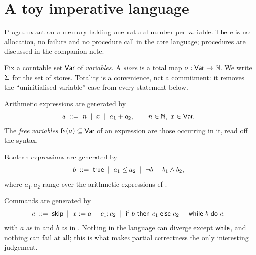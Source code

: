 \section{A toy imperative language}
\label{sec:syntax}

Programs act on a memory holding one natural number per variable. There is no
allocation, no failure and no procedure call in the core language; procedures
are discussed in the companion note.

\begin{definition}[stores]
\label{def:state}
Fix a countable set $\mathsf{Var}$ of \emph{variables}. A \emph{store} is a total map
$\sigma : \mathsf{Var} \to \mathbb{N}$. We write $\Sigma$ for the set of stores. Totality is
a convenience, not a commitment: it removes the ``uninitialised variable'' case
from every statement below.
\end{definition}

\begin{definition}
\label{def:aexp}
Arithmetic expressions are generated by
\[
  a \;::=\; n \;\mid\; x \;\mid\; a_1 + a_2,
  \qquad n \in \mathbb{N},\; x \in \mathsf{Var} .
\]
The \emph{free variables} $\operatorname{fv}(a) \subseteq \mathsf{Var}$ of an expression are those
occurring in it, read off the syntax.
\end{definition}

\begin{definition}
\label{def:bexp}
Boolean expressions are generated by
\[
  b \;::=\; \mathsf{true} \;\mid\; a_1 \le a_2 \;\mid\; \lnot b \;\mid\; b_1 \land b_2 ,
\]
where $a_1, a_2$ range over the arithmetic expressions of .
\end{definition}

\begin{definition}[commands]
\label{def:cmd}
Commands are generated by
\[
  c \;::=\; \mathsf{skip}
     \;\mid\; x := a
     \;\mid\; c_1 ; c_2
     \;\mid\; \mathsf{if}\ b\ \mathsf{then}\ c_1\ \mathsf{else}\ c_2
     \;\mid\; \mathsf{while}\ b\ \mathsf{do}\ c ,
\]
with $a$ as in  and $b$ as in . Nothing in the
language can diverge except $\mathsf{while}$, and nothing can fail at all; this is
what makes partial correctness the only interesting judgement.
\end{definition}
